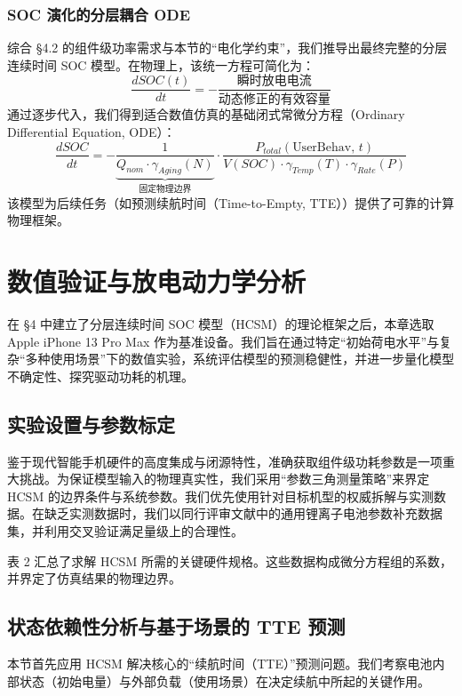 \documentclass[11pt,a4paper]{ctexart}
\begin{document}
\subsubsection{SOC 演化的分层耦合 ODE}

综合 §4.2 的组件级功率需求与本节的“电化学约束”，我们推导出最终完整的分层连续时间 SOC 模型。在物理上，该统一方程可简化为：
\[
\frac{dSOC(t)}{dt} = -\frac{\text{瞬时放电电流}}{\text{动态修正的有效容量}}
\]
通过逐步代入，我们得到适合数值仿真的基础闭式常微分方程（Ordinary Differential Equation, ODE）：
\begin{equation}
\frac{dSOC}{dt} = -\underbrace{\frac{1}{Q_{nom}\cdot\gamma_{Aging}(N)}}_{\text{固定物理边界}}\cdot\frac{P_{total}(\text{UserBehav},\,t)}{V(SOC)\cdot\gamma_{Temp}(T)\cdot\gamma_{Rate}(P)}
\end{equation}
该模型为后续任务（如预测续航时间（Time-to-Empty, TTE））提供了可靠的计算物理框架。
\section{数值验证与放电动力学分析}

在 §4 中建立了分层连续时间 SOC 模型（HCSM）的理论框架之后，本章选取 Apple iPhone 13 Pro Max 作为基准设备。我们旨在通过特定“初始荷电水平”与复杂“多种使用场景”下的数值实验，系统评估模型的预测稳健性，并进一步量化模型不确定性、探究驱动功耗的机理。

\subsection{实验设置与参数标定}

鉴于现代智能手机硬件的高度集成与闭源特性，准确获取组件级功耗参数是一项重大挑战。为保证模型输入的物理真实性，我们采用“参数三角测量策略”来界定 HCSM 的边界条件与系统参数。我们优先使用针对目标机型的权威拆解与实测数据。在缺乏实测数据时，我们以同行评审文献中的通用锂离子电池参数补充数据集，并利用交叉验证满足量级上的合理性。

表 2 汇总了求解 HCSM 所需的关键硬件规格。这些数据构成微分方程组的系数，并界定了仿真结果的物理边界。

\subsection{状态依赖性分析与基于场景的 TTE 预测}

本节首先应用 HCSM 解决核心的“续航时间（TTE）”预测问题。我们考察电池内部状态（初始电量）与外部负载（使用场景）在决定续航中所起的关键作用。
\end{document}
